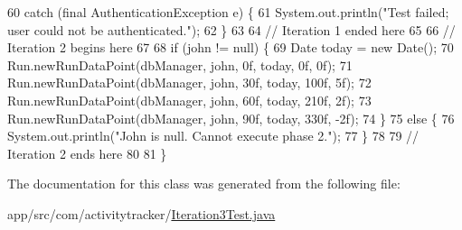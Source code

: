 \begin{DoxyCode}
60         \textcolor{keywordflow}{catch} (\textcolor{keyword}{final} AuthenticationException e) \{
61             System.out.println(\textcolor{stringliteral}{"Test failed; user could not be authenticated."});
62         \}
63 
64         \textcolor{comment}{// Iteration 1 ended here}
65 
66         \textcolor{comment}{// Iteration 2 begins here}
67 
68         \textcolor{keywordflow}{if} (john !=  null) \{
69             Date today = \textcolor{keyword}{new} Date();
70             Run.newRunDataPoint(dbManager, john, 0f, today, 0f, 0f);
71             Run.newRunDataPoint(dbManager, john, 30f, today, 100f, 5f);
72             Run.newRunDataPoint(dbManager, john, 60f, today, 210f, 2f);
73             Run.newRunDataPoint(dbManager, john, 90f, today, 330f, -2f);
74         \}
75         \textcolor{keywordflow}{else} \{
76             System.out.println(\textcolor{stringliteral}{"John is null. Cannot execute phase 2."});
77         \}
78 
79         \textcolor{comment}{// Iteration 2 ends here}
80 
81     \}
\end{DoxyCode}


The documentation for this class was generated from the following file\+:\begin{DoxyCompactItemize}
\item 
app/src/com/activitytracker/\mbox{\hyperlink{_iteration3_test_8java}{Iteration3\+Test.\+java}}\end{DoxyCompactItemize}
